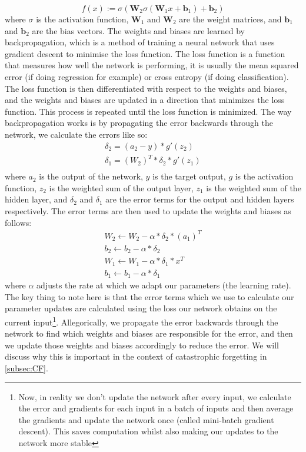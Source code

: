 \begin{equation}
    f(x) := \sigma(\mathbf{W}_2 \sigma(\mathbf{W}_1 x + \mathbf{b}_1) + \mathbf{b}_2)
\end{equation}
where $\sigma$ is the activation function, $\mathbf{W}_1$ and $\mathbf{W}_2$ are the weight matrices, and $\mathbf{b}_1$ and $\mathbf{b}_2$ are the bias vectors. The weights and biases are learned by backpropagation, which is a method of training a neural network that uses gradient descent to minimise the loss function. The loss function is a function that measures how well the network is performing, it is usually the mean squared error (if doing regression for example) or cross entropy (if doing classification). The loss function is then differentiated with respect to the weights and biases, and the weights and biases are updated in a direction that minimizes the loss function. This process is repeated until the loss function is minimized. The way backpropagation works is by propagating the error backwards through the network, we calculate the errors like so:
\begin{align}
    \delta_2 = (a_2 - y) * g'(z_2) \\
    \delta_1 = (W_2)^T * \delta_2 * g'(z_1) \\
\end{align}
where $a_2$ is the output of the network, $y$ is the target output, $g$ is the activation function, $z_2$ is the weighted sum of the output layer, $z_1$ is the weighted sum of the hidden layer, and $\delta_2$ and $\delta_1$ are the error terms for the output and hidden layers respectively. The error terms are then used to update the weights and biases as follows:
\begin{align}
    W_2 \leftarrow W_2 - \alpha * \delta_2 * (a_1)^T \\
    b_2 \leftarrow b_2 - \alpha * \delta_2 \\
    W_1 \leftarrow W_1 - \alpha * \delta_1 * x^T \\
    b_1 \leftarrow b_1 - \alpha * \delta_1 
\end{align}
where $\alpha$ adjusts the rate at which we adapt our parameters (the learning rate). The key thing to note here is that the error terms which we use to calculate our parameter updates are calculated using the loss our network obtains on the current input\footnote{Now, in reality we don't update the network after every input, we calculate the error and gradients for each input in a batch of inputs and then average the gradients and update the network once (called mini-batch gradient descent). This saves computation whilst also making our updates to the network more stable}. Allegorically, we propagate the error backwards through the network to find which weights and biases are responsible for the error, and then we update those weights and biases accordingly to reduce the error. We will discuss why this is important in the context of catastrophic forgetting in \ref{subsec:CF}. 

